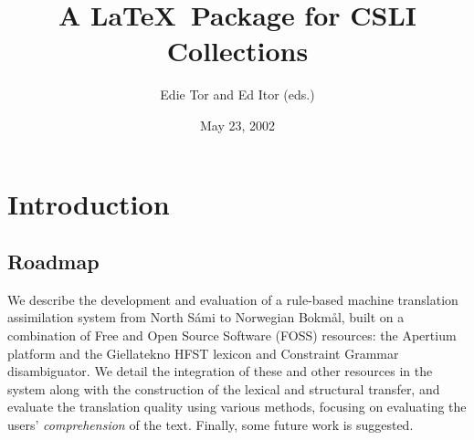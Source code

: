 \documentclass{book}
\title{A \LaTeX\ Package for CSLI Collections}    %
\author{Edie Tor and Ed Itor (eds.)}              %
\date{May 23, 2002}                               %
\begin{document}
\frontmatter      %

\maketitle

\setcounter{page}{5}
\setcounter{tocdepth}{0}  %


\mainmatter


% 


\newcommand{\href}[2]{{\tt #1}} %
\newcommand{\sme}{{\tt sme}}
\newcommand{\nob}{{\tt nob}}
\newcommand{\smenob}{\sme$\rightarrow{}$\nob}
\newcommand{\nobsme}{\nob$\rightarrow{}$\sme}



\section{Introduction} %
\subsection{Roadmap}  
We describe the development and evaluation of a rule-based machine
translation assimilation system from North S\'{a}mi to Norwegian
Bokm{\aa}l, built on a combination of Free and Open Source Software
(FOSS) resources: the Apertium platform and the Giellatekno HFST
lexicon and Constraint Grammar disambiguator. We detail the
integration of these and other resources in the system along with the
construction of the lexical and structural transfer, and evaluate the
translation quality using various methods, focusing on evaluating the
users' \textit{comprehension} of the text. Finally, some future work
is suggested.
\end{document}
